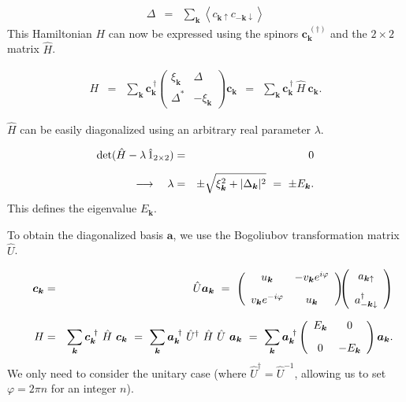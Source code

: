 \documentclass[uplatex,a4j,12pt,dvipdfmx]{jsarticle}
\begin{document}
\begin{eqnarray}
	\Delta
	&=&
	\sum_{\bm{k}}
	\left\langle
	c_{\bm{k} \uparrow}
	c_{-\bm{k} \downarrow}
	\right\rangle
\end{eqnarray}
%
This Hamiltonian $H$ can now be expressed using the spinors $\bm{c}_{\bm{k}}^{\ (\dagger)}$ and the $2 \times 2$ matrix $\hat{H}$.

\begin{eqnarray}
	H
	&=&
	\sum_{\bm{k}}
	\bm{c}^{\ \dagger}_{\bm{k}}
	\!\!
	\left(
	\begin{array}{cc}
			\xi_{\bm{k}} & \Delta        \\[3mm]
			\Delta^{*}   & -\xi_{\bm{k}}
		\end{array}
	\right)
	\!\!
	\bm{c}_{\bm{k}}
	\ \ = \ \
	\sum_{\bm{k}}
	\bm{c}^{\ \dagger}_{\bm{k}}
	\
	\hat{H}
	\
	\bm{c}_{\bm{k}}
	.
\end{eqnarray}
%

$\hat{H}$ can be easily diagonalized using an arbitrary real parameter $\lambda$.

\begin{eqnarray}
	{\rm det} ( \hat{H} - \lambda \ \! \hat{1}_{2 \times 2})
	&=&
	0
	\\[2mm]
	\longrightarrow
	\ \ \
	\lambda
	&=&
	\pm
	\sqrt{ \xi_{\bm{k}}^{2} + | \Delta_{\bm{k}} |^{2} }
	\ = \
	\pm E_{\bm{k}}
	.
\end{eqnarray}
%
This defines the eigenvalue $E_{\bm{k}}$.

To obtain the diagonalized basis $\bm{a}$, we use the Bogoliubov transformation matrix $\hat{U}$.

\begin{eqnarray}
	\bm{c}_{\bm{k}}
	&=&
	\hat{U}
	\bm{a}_{\bm{k}}
	\ = \
	\left(
	\begin{array}{cc}
			u_{\bm{k}}                 & - v_{\bm{k}} e^{i \varphi}
			\\[3mm]
			v_{\bm{k}} e^{- i \varphi} & u_{\bm{k}}
		\end{array}
	\right)
	\!\!\!
	\left(
	\begin{array}{c}
			a_{\bm{k} \uparrow} \\[3mm]
			a_{-\bm{k} \downarrow}^{\dagger}
		\end{array}
	\right)
	\\[2mm]
	\hspace{5mm}
	H
	&=&
	\sum_{\bm{k}}
	\bm{c}^{\ \dagger}_{\bm{k}}
	\
	\hat{H}
	\
	\bm{c}_{\bm{k}}
	\ = \
	\sum_{\bm{k}}
	\bm{a}^{\ \dagger}_{\bm{k}}
	\
	\hat{U}^{\dagger}
	\
	\hat{H}
	\
	\hat{U}
	\
	\bm{a}_{\bm{k}}
	\ = \
	\sum_{\bm{k}}
	\bm{a}^{\ \dagger}_{\bm{k}}
	\left(
	\begin{array}{cc}
			E_{\bm{k}} & 0
			\\[3mm]
			0          & - E_{\bm{k}}
		\end{array}
	\right)
	\bm{a}_{\bm{k}}
	.
\end{eqnarray}
%
We only need to consider the unitary case (where $\hat{U}^{\dagger} = \hat{U}^{-1}$, allowing us to set $\varphi=2 \pi n$ for an integer $n$).
\end{document}
